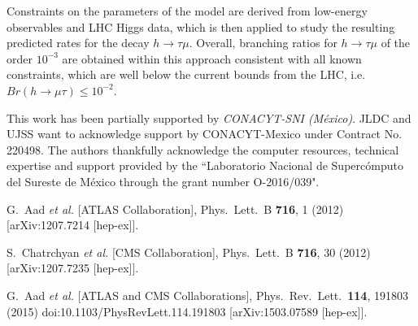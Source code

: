 \documentclass[aps,prd,groupaddress,floatfix,tighten,nofootinbib,showpacs,
amsfonts,superscriptaddress]{revtex4}
\begin{document}
{Constraints on the parameters of the model are derived from low-energy
observables and LHC Higgs data, which is then applied to study the resulting predicted rates for the decay 
$h\rightarrow \tau \mu$. 
Overall, branching ratios for $h \rightarrow \tau \mu$ of the order $10^{-3}$ are obtained within this approach
consistent with all known constraints, which are well below the current bounds from the LHC,
i.e. $Br(h \to \mu  \tau ) \leq 10^{-2}$.

\begin{acknowledgments}
This work has been partially supported  by \textit{CONACYT-SNI (M\'exico)}. 
JLDC and UJSS want to acknowledge support by CONACYT-Mexico under Contract No. 220498. The authors thankfully acknowledge the computer resources, technical expertise and support provided by the ``Laboratorio Nacional de Superc\'omputo del Sureste de M\'exico through the grant number O-2016/039".
\end{acknowledgments}

%
%

\begin{thebibliography}{99}

  G.~Aad {\it et al.}  [ATLAS Collaboration],
  Phys.\ Lett.\ B {\bf 716}, 1 (2012)
  [arXiv:1207.7214 [hep-ex]].


  S.~Chatrchyan {\it et al.}  [CMS Collaboration],
  Phys.\ Lett.\ B {\bf 716}, 30 (2012)
  [arXiv:1207.7235 [hep-ex]].
  
  G.~Aad {\it et al.} [ATLAS and CMS Collaborations],
  Phys.\ Rev.\ Lett.\  {\bf 114}, 191803 (2015)
  doi:10.1103/PhysRevLett.114.191803
  [arXiv:1503.07589 [hep-ex]].


\end{thebibliography}}
\end{document}
